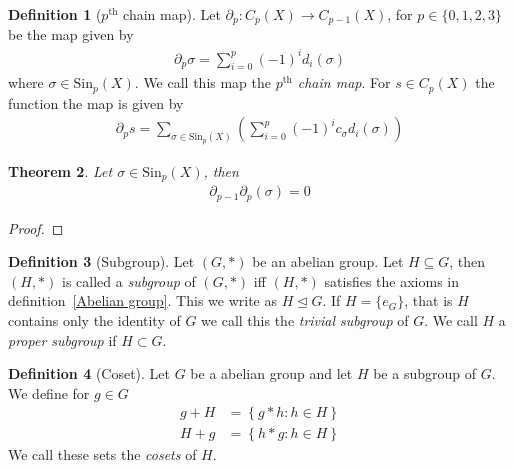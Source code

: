 \documentclass{article}
\theoremstyle{plain}
\newtheorem{theorem}{Theorem}
\theoremstyle{definition}
\newtheorem{definition}[theorem]{Definition}
\newcommand{\Sin}{\text{Sin}}
\newcommand{\del}{\partial}
\begin{document}
\begin{definition}[$p^\text{th}$ chain map]\label{pth chain map}
	Let $\del_p:C_p(X)\rightarrow C_{p-1}(X)$, for $p\in\{0,1,2,3\}$ be the map
	given by
	\begin{equation}
	\begin{aligned}
		\del_p\sigma=\sum^p_{i=0} {(-1)}^i d_i (\sigma)
	\end{aligned}
	\end{equation}
	where $\sigma\in\Sin_p(X)$. We call this map the
	\textit{$p^\text{th}$ chain map}. For $s\in C_p(X)$ the function the map is
	given by
	\begin{equation}
	\begin{aligned}
		\del_ps=\sum_{\sigma\in\Sin_p(X)}\left(\sum^p_{i=0} {(-1)}^i c_\sigma 
			d_i(\sigma)\right)
	\end{aligned}
	\end{equation}
\end{definition}
\begin{theorem}
	Let $\sigma\in\Sin_p(X)$, then
	\begin{equation}
	\begin{aligned}
		\del_{p-1}\del_p(\sigma)=0
	\end{aligned}
	\end{equation}
\end{theorem}
\begin{proof}
\end{proof}
\begin{definition}[Subgroup]\label{subgroup}
	Let $(G,*)$ be an abelian group. Let $H\subseteq G$, then $(H,*)$
	is called a \textit{subgroup} of $(G,*)$ iff $(H,*)$ satisfies
	the axioms in definition~\ref{Abelian group}. This we write as
	$H\trianglelefteq G$. If $H=\{e_G\}$, that is $H$ contains only the
	identity of $G$ we call this the \textit{trivial subgroup} of $G$.
	We call $H$ a \textit{proper subgroup} if $H\subset G$.
\end{definition}
\begin{definition}[Coset]\label{coset}
	Let $G$ be a abelian group and let $H$ be a subgroup of $G$. We define for
	$g\in G$
	\begin{equation}
	\begin{aligned}
		g+H &=\left\{g*h:h\in H\right\}\\
		H+g &=\left\{h*g:h\in H\right\}
	\end{aligned}
	\end{equation}
	We call these sets the \textit{cosets} of $H$.
\end{definition}
\end{document}
